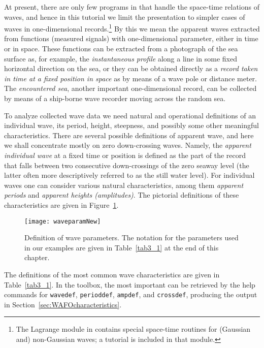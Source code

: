 At present, there are only few programs in \progname{} that
handle the space-time relations of waves, and hence in this tutorial we limit 
the presentation to simpler cases of waves in one-dimensional 
records.\footnote{The Lagrange module in \progname{} contains special  
space-time routines for (Gaussian and) non-Gaussian waves; a tutorial is included in that module.} 
By this we mean the apparent waves extracted from functions
(measured signals) with one-dimensional parameter, either in time or in
space. These functions can be extracted from a photograph of the sea
surface as, for example, the {\it instantaneous profile} along a line
in some fixed horizontal direction on the sea, or they can be obtained
directly as a {\em record taken in time at a fixed position in space}
as by means of a wave pole or distance meter.  The
{\em encountered sea},
another important one-dimensional record, can be collected
by means of a ship-borne wave recorder moving across the random sea.

To analyze collected wave data we need natural and operational
definitions of an individual wave, its period, height, steepness, and
possibly some other meaningful characteristics. There are several
possible definitions of apparent wave, and here we shall concentrate
mostly on zero down-crossing waves. Namely, the
{\em apparent individual wave}
at a fixed time or position is defined as the part
of the record that falls between two consecutive down-crossings of the
zero seaway level (the latter often more descriptively referred to as
the still water level).  For individual waves one can consider various
natural characteristics, among them {\em apparent periods}  and
{\em apparent heights (amplitudes)}. The pictorial definitions of these
characteristics are given in 
Figure~\ref{fig:wavpar}. 
\begin{figure}[tbh]
\centering
  \texttt{[image: waveparamNew]}
\vspace{-3mm}
  \caption[Definition of wave parameters]
{Definition of wave parameters. The notation for the parameters
used in our examples are given in Table~\ref{tab3_1} at the end of this chapter.}
  \label{fig:wavpar}
  \end{figure}

The definitions of the most common wave characteristics are given in
Table~\ref{tab3_1}. In the \progname{} toolbox, the most important can be
retrieved by the help commands for {\tt wavedef}, {\tt perioddef},
{\tt ampdef}, and {\tt crossdef}, producing the output in
Section~\ref{sec:WAFOcharacteristics}.


